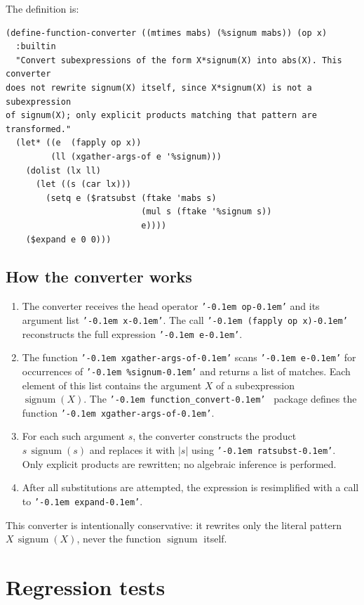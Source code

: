 \documentclass[12pt,fleqn]{extarticle}
\newcommand{\ttq}[1]{\texttt{'\kern-0.1em #1\kern-0.1em'}}
\newcommand{\funconvert}{\ttq{function\_convert}{ }}
\newenvironment{maximabox}
  {\begin{tcolorbox}[
      breakable,
      enhanced,
      colback=white,
      colframe=black!8,
      boxrule=0pt,
      borderline west={2.2pt}{0pt}{black!25},
      arc=1pt,
      left=11pt,
      right=7pt,
      top=9pt,
      bottom=9pt,
      before skip=14pt,
      after skip=14pt
    ]}
  {\end{tcolorbox}}
\DeclareMathOperator{\signum}{signum}
\begin{document}
The definition is:

\begin{maximabox}
\begin{verbatim}
(define-function-converter ((mtimes mabs) (%signum mabs)) (op x)
  :builtin
  "Convert subexpressions of the form X*signum(X) into abs(X). This converter
does not rewrite signum(X) itself, since X*signum(X) is not a subexpression
of signum(X); only explicit products matching that pattern are transformed."
  (let* ((e  (fapply op x))
         (ll (xgather-args-of e '%signum)))
    (dolist (lx ll)
      (let ((s (car lx)))
        (setq e ($ratsubst (ftake 'mabs s)
                           (mul s (ftake '%signum s))
                           e))))
    ($expand e 0 0)))
\end{verbatim}
\end{maximabox}

\subsection*{How the converter works}

\begin{enumerate}[label=(\alph*), noitemsep, topsep=0pt]
  \item The converter receives the head operator \ttq{op} and its argument list
        \ttq{x}. The call \ttq{(fapply op x)} reconstructs the full expression
        \ttq{e}.

  \item The function \ttq{xgather-args-of} scans \ttq{e} for occurrences of
        \ttq{\%signum} and returns a list of matches. Each element of this list
        contains the argument $X$ of a subexpression $\signum(X)$. The
        \funconvert\ package defines the function \ttq{xgather-args-of}.

  \item For each such argument $s$, the converter constructs the product
        $s\,\signum(s)$ and replaces it with $|s|$ using \ttq{ratsubst}. Only
        explicit products are rewritten; no algebraic inference is performed.

  \item After all substitutions are attempted, the expression is resimplified
        with a call to \ttq{expand}.
\end{enumerate}
\noindent This converter is intentionally conservative: it rewrites only the literal
pattern $X\,\signum(X)$, never the function $\signum$ itself.


\section{Regression tests}
\end{document}
